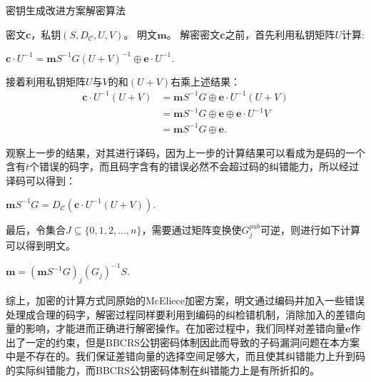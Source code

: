 \begin{breakablealgorithm}
	\small
	\renewcommand{\algorithmicrequire}{\textbf{Input:}}
	\renewcommand{\algorithmicensure}{\textbf{Output:}}
	\caption{密钥生成改进方案解密算法}
	\label{alg:NewDe}
	\begin{algorithmic}[1]
		\Require
		密文$\mathbf{c}$，私钥$(S,D_\mathcal{C},U,V)$。
		\Ensure
		明文$\mathbf{m}$。
		\State
		解密密文$\mathbf{c}$之前，首先利用私钥矩阵$U$计算:
		\begin{center}
			$\textbf{c}\cdot U^{-1} = \textbf{m}S^{-1}G(U+V)^{-1} \oplus\textbf{e}\cdot U^{-1}.$
		\end{center}
		\State
		接着利用私钥矩阵$U$与$V$的和$(U + V)$右乘上述结果：
		\begin{equation}
			\begin{aligned}
				\textbf{c}\cdot U^{-1}(U+V) &= \textbf{m}S^{-1}G \oplus\textbf{e}\cdot U^{-1}(U+V) \\
				& = \textbf{m}S^{-1}G \oplus  \textbf{e} \oplus \textbf{e}\cdot U^{-1}V \\
				& = \textbf{m}S^{-1}G \oplus  \textbf{e}.
			\end{aligned}
		\end{equation}
		
		\State
		观察上一步的结果，对其进行译码，因为上一步的计算结果可以看成为是码的一个含有$t$个错误的码字，而且码字含有的错误必然不会超过码的纠错能力，所以经过译码可以得到：
		\begin{center}
			$\mathbf{m}S^{-1}G = D_\mathcal{C}(\textbf{c}\cdot U^{-1}(U+V)).$
		\end{center}
		
		\State
		最后，令集合$J \subseteq \{0,1,2,...,n\}$，需要通过矩阵变换使$G_j^{pub}$可逆，则进行如下计算可以得到明文。
		\begin{center}
			$\mathbf{m} = (\mathbf{m}S^{-1}G)_j(G_j)^{-1}S.$
		\end{center}		
	\end{algorithmic}
\end{breakablealgorithm}

综上，加密的计算方式同原始的McEliece加密方案，明文通过编码并加入一些错误处理成合理的码字，解密过程同样要利用到编码的纠检错机制，消除加入的差错向量的影响，才能进而正确进行解密操作。在加密过程中，我们同样对差错向量$\mathbf{e}$作出了一定的约束，但是BBCRS公钥密码体制因此而导致的子码漏洞问题在本方案中是不存在的。我们保证差错向量的选择空间足够大，而且使其纠错能力上升到码的实际纠错能力，而BBCRS公钥密码体制在纠错能力上是有所折扣的。

